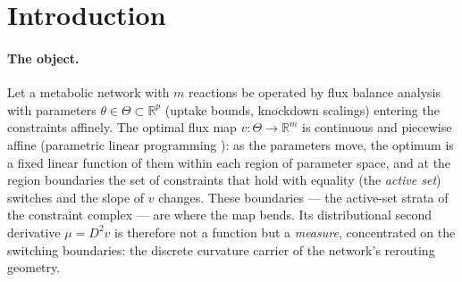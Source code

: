 \documentclass[11pt,a4paper]{article}
\theoremstyle{plain}
\theoremstyle{definition}
\theoremstyle{remark}
\newcommand{\RR}{\mathbb{R}}
\begin{document}
\section{Introduction}\label{sec:intro}


\paragraph{The object.}
Let a metabolic network with $m$ reactions be operated by flux balance
analysis \citep{varma1994, orth2010} with parameters $\theta \in \Theta \subset \RR^p$
(uptake bounds, knockdown scalings) entering the constraints
affinely. The optimal flux map $v : \Theta \to \RR^m$ is continuous
and piecewise affine (parametric linear programming
\citep{borrelli2003}): as the parameters move, the optimum is a fixed
linear function of them within each region of parameter space, and at
the region boundaries the set of constraints that hold with equality
(the \emph{active set}) switches and the slope of $v$ changes. These
boundaries --- the active-set strata of the constraint complex --- are
where the map bends. Its distributional second derivative
$\mu = D^2 v$ is therefore not a function but a \emph{measure},
concentrated on the switching boundaries: the discrete curvature
carrier of the network's rerouting geometry.
\end{document}
